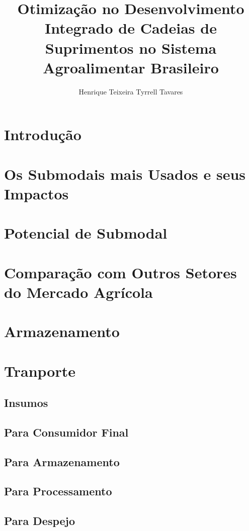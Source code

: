 \documentclass[]{article}
\title{Otimização no Desenvolvimento Integrado de Cadeias de Suprimentos no Sistema Agroalimentar Brasileiro}
\author{Henrique Teixeira Tyrrell Tavares}
\begin{document}
	
	\maketitle
	
	\begin{abstract}
		
	\end{abstract}
	
	\section{Introdução}
	
	\section{Os Submodais mais Usados e seus Impactos}
	
	\section{Potencial de Submodal}
	
	\section{Comparação com Outros Setores do Mercado Agrícola}
	
	\section{Armazenamento}
	
	\section{Tranporte}
	
	\subsection{Insumos}
	
	\subsection{Para Consumidor Final}
	
	\subsection{Para Armazenamento}
	
	\subsection{Para Processamento}
	
	\subsection{Para Despejo}
	
	
	
\end{document}
